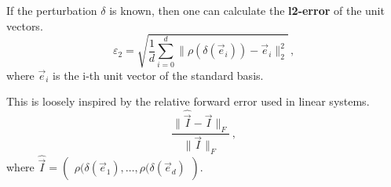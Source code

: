 If the perturbation $\delta$ is known, then one can calculate the \textbf{l2-error} of the unit vectors. 
\begin{equation}
\label{eqn:l2_error}
    \varepsilon_2 = \sqrt{ \frac 1 d \sum_{i=0}^d \|\rho (\delta (\vec e_i)) 
        - \vec e_i  \|_2^2 } \,,
\end{equation}
where $\vec e_i$ is the i-th unit vector of the standard basis.

This is loosely inspired by the relative forward error used in linear systems.
%
\begin{equation*}
    \frac {\|\widehat {\vec I} - \vec I\|_F} {\|\vec I\|_F} \,,
\end{equation*}
where $\widehat {\vec I} = \begin{pmatrix} \rho (\delta (\vec e_1), \dots, \rho (\delta (\vec e_d) \end{pmatrix}$.


